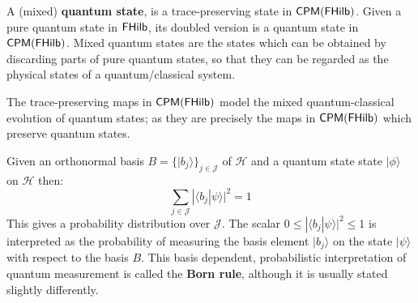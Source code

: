A (mixed) {\bf quantum state}, is a trace-preserving state in $\mathsf{CPM}(\mathsf{FHilb})$.  
Given a pure quantum state in $\mathsf{FHilb}$, its doubled version is a quantum state in $\mathsf{CPM}(\mathsf{FHilb})$.
Mixed quantum states are the states which can be obtained by discarding parts of pure quantum states, so that they can be regarded as the physical states of a quantum/classical system.


The trace-preserving maps in $\mathsf{CPM}(\mathsf{FHilb})$ model the mixed quantum-classical evolution of quantum states; as they are precisely the maps in $\mathsf{CPM}(\mathsf{FHilb})$ which preserve quantum states.



Given an orthonormal basis $B=\{ |b_j\rangle \}_{j \in \mathcal J}$ of $\mathcal H$ and a quantum state state $|\phi\rangle$ on $\mathcal H$ then:
$$
\sum_{j\in \mathcal J}
 |\langle b_j|\psi \rangle|^2
=1
$$ 
This gives a probability distribution over $\mathcal J$.  The scalar  $0\leq |\langle b_j|\psi \rangle|^2\leq 1$ is interpreted as the probability of measuring the basis element $|b_j\rangle$ on the state $|\psi\rangle$ with respect to the basis $B$.
This basis dependent, probabilistic interpretation of quantum measurement is called the {\bf Born rule}, although it is usually stated slightly differently.

